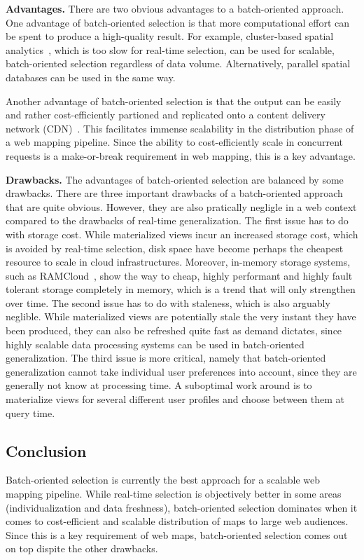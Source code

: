 \documentclass[11pt, oneside]{report}
\newcommand{\minisec}[1]{\noindent\textbf{#1.}}
\begin{document}
{\minisec{Advantages}
There are two obvious advantages to a batch-oriented approach. One advantage of batch-oriented selection is that more computational effort can be spent to produce a high-quality result. For example, cluster-based spatial analytics~\cite{eldawy2014spatialhadoop,aji2013hadoopgis}, which is too slow for real-time selection, can be used for scalable, batch-oriented selection regardless of data volume. Alternatively, parallel spatial databases can be used in the same way.

Another advantage of batch-oriented selection is that the output can be easily and rather cost-efficiently partioned and replicated onto a content delivery network (CDN)~\cite{gaffuri12vectortiles}. This facilitates immense scalability in the distribution phase of a web mapping pipeline. Since the ability to cost-efficiently scale in concurrent requests is a make-or-break requirement in web mapping, this is a key advantage.

\minisec{Drawbacks}
The advantages of batch-oriented selection are balanced by some drawbacks. There are three important drawbacks of a batch-oriented approach that are quite obvious. However, they are also pratically negligle in a web context compared to the drawbacks of real-time generalization. The first issue has to do with storage cost. While materialized views incur an increased storage cost, which is avoided by real-time selection, disk space have become perhaps the cheapest resource to scale in cloud infrastructures. Moreover, in-memory storage systems, such as RAMCloud~\cite{ousterhout2011ramcloud}, show the way to cheap, highly performant and highly fault tolerant storage completely in memory, which is a trend that will only strengthen over time. The second issue has to do with staleness, which is also arguably neglible. While materialized views are potentially stale the very instant they have been produced, they can also be refreshed quite fast as demand dictates, since highly scalable data processing systems can be used in batch-oriented generalization. The third issue is more critical, namely that batch-oriented generalization cannot take individual user preferences into account, since they are generally not know at processing time. A suboptimal work around is to materialize views for several different user profiles and choose between them at query time.

\subsection{Conclusion}
Batch-oriented selection is currently the best approach for a scalable web mapping pipeline. While real-time selection is objectively better in some areas (individualization and data freshness), batch-oriented selection dominates when it comes to cost-efficient and scalable distribution of maps to large web audiences. Since this is a key requirement of web maps, batch-oriented selection comes out on top dispite the other drawbacks.

}
\end{document}
